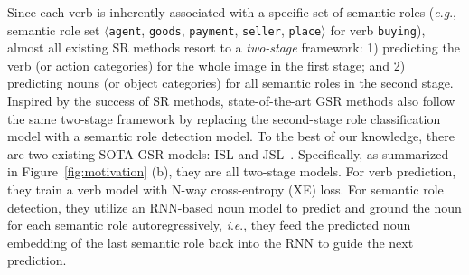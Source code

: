 \documentclass[letterpaper]{article} %
\newcommand{\ie}{\textit{i}.\textit{e}.}
\newcommand{\eg}{\textit{e}.\textit{g}.}
\begin{document}
Since each verb is inherently associated with a specific set of semantic roles (\eg, semantic role set $\langle$\texttt{agent}, \texttt{goods}, \texttt{payment}, \texttt{seller}, \texttt{place}$\rangle$ for verb \texttt{buying}), almost all existing SR methods resort to a \emph{two-stage} framework: 1) predicting the verb (or action categories) for the whole image in the first stage; and 2) predicting nouns (or object categories) for all semantic roles in the second stage. Inspired by the success of SR methods, state-of-the-art GSR methods also follow the same two-stage framework by replacing the second-stage role classification model with a semantic role detection model. To the best of our knowledge, there are two existing SOTA GSR models: ISL and JSL~\cite{pratt2020grounded}. Specifically, as summarized in Figure~\ref{fig:motivation} (b), they are all two-stage models. For verb prediction, they train a verb model with N-way cross-entropy (XE) loss. For semantic role detection, they utilize an RNN-based noun model to predict and ground the noun for each semantic role autoregressively, \ie, they feed the predicted noun embedding of the last semantic role back into the RNN to guide the next prediction.



\end{document}
